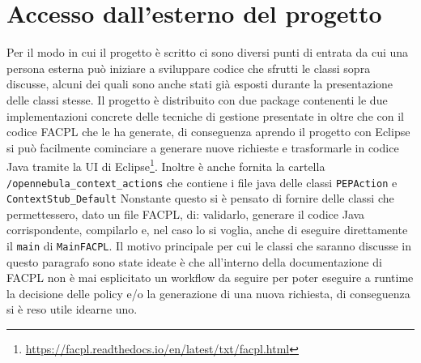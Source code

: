 \section{Accesso dall'esterno del progetto}
Per il modo in cui il progetto è scritto ci sono diversi punti di entrata da cui una persona esterna può iniziare a sviluppare codice che sfrutti le classi sopra discusse, alcuni dei quali sono anche stati già esposti durante la presentazione delle classi stesse. Il progetto è distribuito con due package contenenti le due implementazioni concrete delle tecniche di gestione presentate in \cite{10.1007/978-3-319-08260-8_6} oltre che con il codice FACPL che le ha generate, di conseguenza aprendo il progetto con Eclipse si può facilmente cominciare a generare nuove richieste e trasformarle in codice Java tramite la UI di Eclipse\footnote{\url{https://facpl.readthedocs.io/en/latest/txt/facpl.html}}. Inoltre è anche fornita la cartella \texttt{/opennebula\_context\_actions} che contiene i file java delle classi \texttt{PEPAction} e \texttt{ContextStub\_Default}\medbreak
Nonstante questo si è pensato di fornire delle classi che permettessero, dato un file FACPL, di: validarlo, generare il codice Java corrispondente, compilarlo e, nel caso lo si voglia, anche di eseguire direttamente il \texttt{main} di \texttt{MainFACPL}. Il motivo principale per cui le classi che saranno discusse in questo paragrafo sono state ideate è che all'interno della documentazione di FACPL non è mai esplicitato un workflow da seguire per poter eseguire a runtime la decisione delle policy e/o la generazione di una nuova richiesta, di conseguenza si è reso utile idearne uno.
